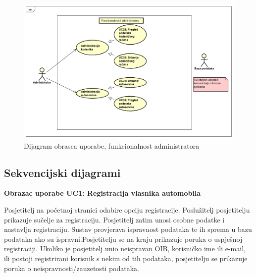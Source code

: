 \begin{figure}[H]
	\includegraphics[width=\linewidth]{dijagrami/diagram2.png}
	\centering
	\caption{Dijagram obrasca uporabe, funkcionalnost administratora}
	\label{fig:diagram2}
\end{figure}


\eject

\subsection{Sekvencijski dijagrami}


\textbf{Obrazac uporabe UC1: Registracija vlasnika automobila}

\noindent Posjetitelj na početnoj stranici odabire opciju registracije. Poslužitelj posjetitelju prikazuje sučelje za registraciju. Posjetitelj zatim unosi osobne podatke i nastavlja registraciju. Sustav provjerava ispravnost podataka te ih sprema u bazu podataka ako su ispravni.Posjetitelju se na kraju prikazuje poruka o uspješnoj registraciji. Ukoliko je posjetitelj unio neispravan OIB, korisničko ime ili e-mail, ili postoji registrirani korisnik s nekim od tih podataka, posjetitelju se prikazuje poruka o neispravnosti/zauzetosti podataka.

